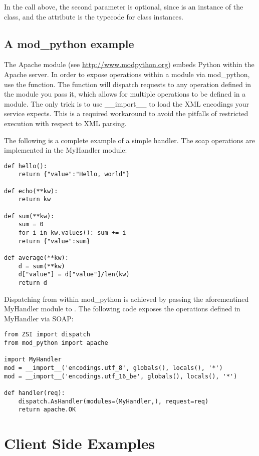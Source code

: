 In the  call above, the second parameter is optional, since
 is an instance of the  class, and the 
 attribute is the typecode for class instances.


\subsection{A mod_python example}

The Apache module  (see
\url{http://www.modpython.org}) embeds Python within the Apache server.
In order to expose operations within a module via mod_python, use the 
 function.  The 
function will dispatch requests to any operation defined in the module you
pass it, which allows for multiple operations to be defined in a module.
The only trick is to use __import__ to load the XML encodings your service 
expects.  This is a required workaround to avoid the pitfalls of restricted
execution with respect to XML parsing.

The following is a complete example of a simple handler.  The soap operations
are implemented in the MyHandler module:

\begin{verbatim}
def hello():
    return {"value":"Hello, world"}

def echo(**kw):
    return kw

def sum(**kw):
    sum = 0
    for i in kw.values(): sum += i
	return {"value":sum}

def average(**kw):
	d = sum(**kw)
    d["value"] = d["value"]/len(kw)
	return d
\end{verbatim}

Dispatching from within mod_python is achieved by passing the aforementined
MyHandler module to .  The following code exposes
the operations defined in MyHandler via SOAP:

\begin{verbatim}
from ZSI import dispatch
from mod_python import apache

import MyHandler
mod = __import__('encodings.utf_8', globals(), locals(), '*')
mod = __import__('encodings.utf_16_be', globals(), locals(), '*')

def handler(req):
    dispatch.AsHandler(modules=(MyHandler,), request=req)
    return apache.OK
\end{verbatim}


\section{Client Side Examples}

